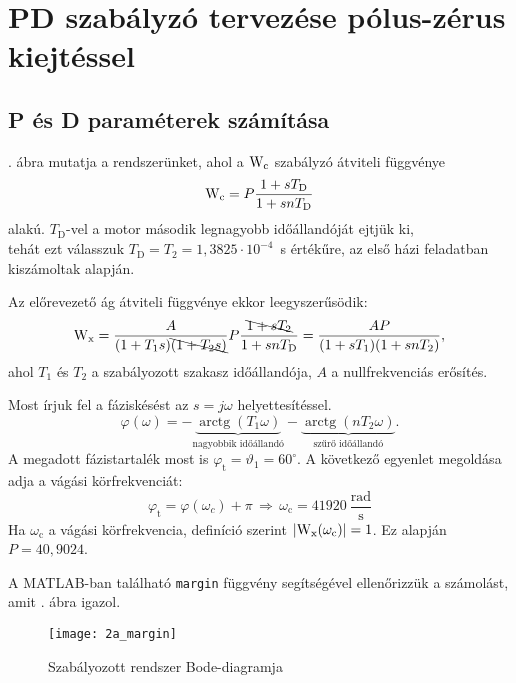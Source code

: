 \section{PD szabályzó tervezése pólus-zérus kiejtéssel}

\subsection{P és D paraméterek számítása}

. ábra mutatja a rendszerünket, ahol a $ \mathrm{W}_\text{c} $ szabályzó átviteli függvénye
\begin{equation}
	\mathrm{W}_\text{c} = P\frac{1+sT_\text{D}}{1+snT_\text{D}}
\end{equation}
alakú.
$T_\text{D}$-vel a motor második legnagyobb időállandóját ejtjük ki,\\
tehát ezt válasszuk \mbox{$T_\text{D}=T_2=1,3825\cdot 10^{-4}$ s} értékűre,
az első házi feladatban kiszámoltak alapján.

Az előrevezető ág átviteli függvénye ekkor leegyszerűsödik:
\begin{equation}
	\mathrm{W}_\text{x}
	= \frac{A}{(1+T_1s)\bcancel{(1+T_2s)}}P\frac{\bcancel{1+sT_\text{2} }}{1+snT_\text{D}}
	= \frac{AP}{(1+sT_1)(1+snT_2)},
\end{equation}
ahol $T_1$ és $T_2$ a szabályozott szakasz időállandója, $A$ a nullfrekvenciás erősítés.

Most írjuk fel a fáziskésést az $s=j\omega$ helyettesítéssel.
\begin{equation}
	\varphi(\omega) = -\underbrace{\operatorname{arctg}(T_1\omega)}_\text{nagyobbik időállandó} -\underbrace{\operatorname{arctg}(nT_2\omega)}_\text{szűrő időállandó}.
\end{equation}
A megadott fázistartalék most is $\varphi_\text{t} = \vartheta_1=60^\circ$. A következő egyenlet megoldása adja a vágási
körfrekvenciát:
\begin{equation}
	\varphi_\text{t} = \varphi(\omega_c) +\pi \,\Rightarrow\, \omega_\text{c} = 41920~\frac{\text{rad}}{\text{s}}
\end{equation}
Ha $\omega_\text{c}$ a vágási körfrekvencia, definíció szerint $\left\lvert \mathrm{W}_\text{x}(\omega_\text{c}) \right\rvert = 1$.
Ez alapján $ P = 40,9024$.

A MATLAB-ban található \verb|margin| függvény segítségével ellenőrizzük a számolást, amit . ábra igazol.
\begin{figure}[H]
	\centering
	\texttt{[image: 2a\_margin]}
	\caption{Szabályozott rendszer Bode-diagramja}
	\label{fig:2a_margin}
\end{figure}

